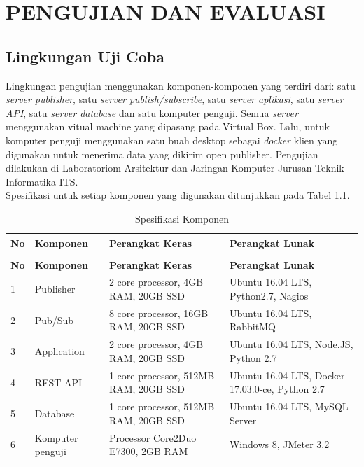 \chapter{PENGUJIAN DAN EVALUASI}

\section{Lingkungan Uji Coba}
	Lingkungan pengujian menggunakan komponen-komponen yang terdiri dari: satu \textit{server publisher}, satu \textit{server publish/subscribe}, satu \textit{server aplikasi}, satu \textit{server API}, satu \textit{server database} dan satu komputer penguji. Semua \textit{server} menggunakan vitual machine yang dipasang pada Virtual Box. Lalu, untuk komputer penguji menggunakan satu buah desktop sebagai \textit{docker} klien yang digunakan untuk menerima data yang dikirim open publisher. Pengujian dilakukan di Laboratoriom Arsitektur dan Jaringan Komputer Jurusan Teknik Informatika ITS. \\
    \indent Spesifikasi untuk setiap komponen yang digunakan ditunjukkan pada Tabel \ref{spesifikasikomponen}.
    \begin{longtable}{|p{}|p{}|p{}|p{}|}					\caption{Spesifikasi Komponen} \label{spesifikasikomponen} \\
        \hline
        \textbf{No} & \textbf{Komponen} & \textbf{Perangkat Keras} & \textbf{Perangkat Lunak} \\ \hline
        \endfirsthead
        \caption[]{Spesifikasi Komponen} \\
        \hline
        \textbf{No} & \textbf{Komponen} & \textbf{Perangkat Keras} & \textbf{Perangkat Lunak} \\ \hline
        \endhead
        \endfoot
        \endlastfoot

    	1 & Publisher & 2 core processor, 4GB RAM, 20GB SSD & Ubuntu 16.04 LTS, Python2.7, Nagios \\ \hline
        2 & Pub/Sub & 8 core processor, 16GB RAM, 20GB SSD & Ubuntu 16.04 LTS, RabbitMQ \\ \hline
        3 & Application & 2 core processor, 4GB RAM, 20GB SSD & Ubuntu 16.04 LTS, Node.JS, Python 2.7 \\ \hline
        4 & REST API & 1 core processor, 512MB RAM, 20GB SSD & Ubuntu 16.04 LTS, Docker 17.03.0-ce, Python 2.7 \\ \hline
        5 & Database & 1 core processor, 512MB RAM, 20GB SSD & Ubuntu 16.04 LTS, MySQL Server \\ \hline
        6 & Komputer penguji & Processor Core2Duo E7300, 2GB RAM & Windows 8, JMeter 3.2 \\ \hline
    \end{longtable}
    
